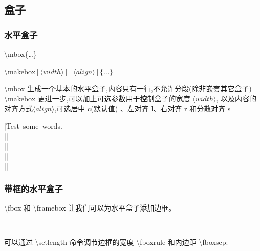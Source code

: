 \documentclass[a4paper]{ctexart}
\begin{document}
    \subsection{盒子}
    \subsubsection{水平盒子}
    \textbackslash mbox\{\ldots \}\par
    \textbackslash makebox$[\langle width\rangle][\langle align\rangle]\{\ldots \}$\par
    \textbackslash mbox 生成一个基本的水平盒子,内容只有一行,不允许分段(除非嵌套其它盒子)
    \textbackslash makebox 更进一步,可以加上可选参数用于控制盒子的宽度 $\langle width\rangle$,%
    以及内容的对齐方式$\langle align\rangle$,可选居中 c(默认值) 、左对齐 l、右对齐 r 和分散对齐 s\par
    |\mbox{Test some words.}|\\
    ||\\
    ||\\
    ||\\
    ||\par
    \subsubsection{带框的水平盒子}
    \textbackslash fbox 和 \textbackslash framebox 让我们可以为水平盒子添加边框。\par
    \\
    \par
    可以通过 \textbackslash setlength 命令调节边框的宽度 \textbackslash fboxrule %
    和内边距 \textbackslash fboxsep:\par
    \\
    \setlength{\fboxrule}{1.6pt}
    \setlength{\fboxsep}{1em}
    \par
\end{document}
